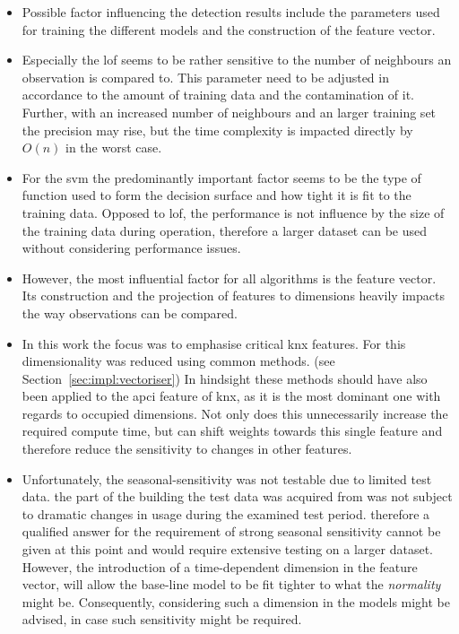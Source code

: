 \begin{itemize}
	\item Possible factor influencing the detection results include the parameters used for training the different models and the construction of the feature vector.
	\item Especially the \gls{lof} seems to be rather sensitive to the number of neighbours an observation is compared to. This parameter need to be adjusted in accordance to the amount of training data and the contamination of it. Further, with an increased number of neighbours and an larger training set the precision may rise, but the time complexity is impacted directly by \(O(n)\) in the worst case.
	\item For the \gls{svm} the predominantly important factor seems to be the type of function used to form the decision surface and how tight it is fit to the training data. Opposed to \gls{lof}, the performance is not influence by the size of the training data during operation, therefore a larger dataset can be used without considering performance issues.
	\item However, the most influential factor for all algorithms is the feature vector. Its construction and the projection of features to dimensions heavily impacts the way observations can be compared.
	\item In this work the focus was to emphasise critical \gls{knx} features. For this dimensionality was reduced using common methods. (see Section~\ref{sec:impl:vectoriser}) In hindsight these methods should have also been applied to the \gls{apci} feature of \gls{knx}, as it is the most dominant one with regards to occupied dimensions. Not only does this unnecessarily increase the required compute time, but can shift weights towards this single feature and therefore reduce the sensitivity to changes in other features.	
	
	\item Unfortunately, the seasonal-sensitivity was not testable due to limited test data.
	\subitem the part of the building the test data was acquired from was not subject to dramatic changes in usage during the examined test period.
	\subitem therefore a qualified answer for the requirement of strong seasonal sensitivity cannot be given at this point and would require extensive testing on a larger dataset.
	\subitem However, the introduction of a time-dependent dimension in the feature vector, will allow the base-line model to be fit tighter to what the \emph{normality} might be. Consequently, considering such a dimension in the models might be advised, in case such sensitivity might be required.
	

\end{itemize}
